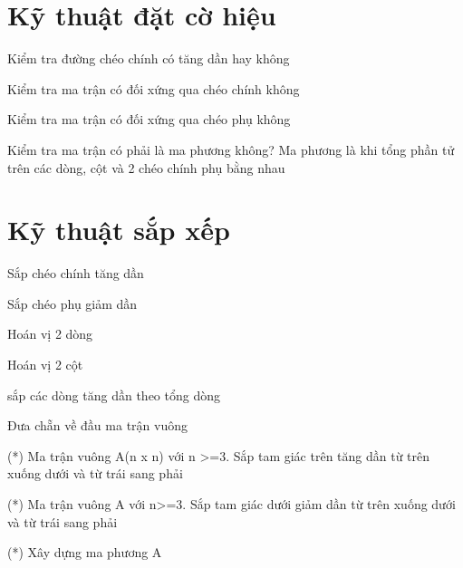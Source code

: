 \section{Kỹ thuật đặt cờ hiệu}
\begin{problem}
    Kiểm tra đường chéo chính có tăng dần hay không
\end{problem}
\begin{problem}
    Kiểm tra ma trận có đối xứng qua chéo chính không
\end{problem}
\begin{problem}
    Kiểm tra ma trận có đối xứng qua chéo phụ không
\end{problem}
\begin{problem}
    Kiểm tra ma trận có phải là ma phương không? Ma phương là khi tổng phần tử trên các dòng, cột và 2 chéo chính phụ bằng nhau
\end{problem}


\section{Kỹ thuật sắp xếp}
\begin{problem}
    Sắp chéo chính tăng dần
\end{problem}
\begin{problem}
    Sắp chéo phụ giảm dần
\end{problem}
\begin{problem}
    Hoán vị 2 dòng
\end{problem}
\begin{problem}
    Hoán vị 2 cột
\end{problem}
\begin{problem}
    sắp các dòng tăng dần theo tổng dòng
\end{problem}
\begin{problem}
    Đưa chẵn về đầu ma trận vuông
\end{problem}
\begin{problem}
    (*) Ma trận vuông A(n x n) với n >=3. Sắp tam giác trên tăng dần từ trên xuống dưới và từ trái sang phải
\end{problem}
\begin{problem}
    (*) Ma trận vuông A với n>=3. Sắp tam giác dưới giảm dần từ trên xuống dưới và từ trái sang phải
\end{problem}
\begin{problem}
    (*) Xây dựng ma phương A
\end{problem}


